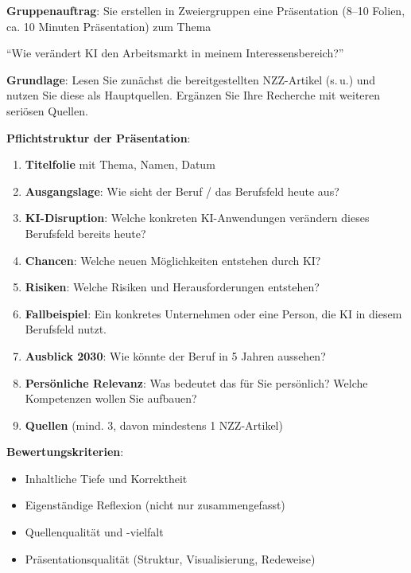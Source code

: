 \begin{myexercise}
\textbf{Gruppenauftrag}: Sie erstellen in Zweiergruppen eine Präsentation
(8--10 Folien, ca. 10 Minuten Präsentation) zum Thema

\begin{center}
    \enquote{Wie verändert KI den Arbeitsmarkt in meinem Interessensbereich?}
\end{center}

\textbf{Grundlage}: Lesen Sie zunächst die bereitgestellten NZZ-Artikel
(s.\,u.) und nutzen Sie diese als Hauptquellen. Ergänzen Sie Ihre Recherche
mit weiteren seriösen Quellen.

\medskip
\textbf{Pflichtstruktur der Präsentation}:
\begin{enumerate}
    \item \textbf{Titelfolie} mit Thema, Namen, Datum
    \item \textbf{Ausgangslage}: Wie sieht der Beruf / das Berufsfeld heute aus?
    \item \textbf{KI-Disruption}: Welche konkreten KI-Anwendungen verändern
          dieses Berufsfeld bereits heute?
    \item \textbf{Chancen}: Welche neuen Möglichkeiten entstehen durch KI?
    \item \textbf{Risiken}: Welche Risiken und Herausforderungen entstehen?
    \item \textbf{Fallbeispiel}: Ein konkretes Unternehmen oder eine Person,
          die KI in diesem Berufsfeld nutzt.
    \item \textbf{Ausblick 2030}: Wie könnte der Beruf in 5 Jahren aussehen?
    \item \textbf{Persönliche Relevanz}: Was bedeutet das für Sie persönlich?
          Welche Kompetenzen wollen Sie aufbauen?
    \item \textbf{Quellen} (mind. 3, davon mindestens 1 NZZ-Artikel)
\end{enumerate}

\textbf{Bewertungskriterien}:
\begin{itemize}
    \item Inhaltliche Tiefe und Korrektheit
    \item Eigenständige Reflexion (nicht nur zusammengefasst)
    \item Quellenqualität und -vielfalt
    \item Präsentationsqualität (Struktur, Visualisierung, Redeweise)
\end{itemize}
\end{myexercise}

